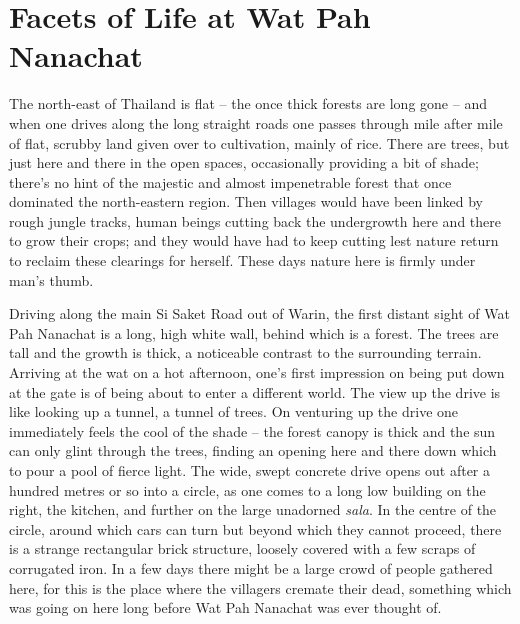 

\chapter{Facets of Life at Wat Pah Nanachat}
\markright{\chapterAuthor}

The north-east of Thailand is flat -- the once thick forests are long
gone -- and when one drives along the long straight roads one passes
through mile after mile of flat, scrubby land given over to cultivation,
mainly of rice. There are trees, but just here and there in the open
spaces, occasionally providing a bit of shade; there's no hint of the
majestic and almost impenetrable forest that once dominated the
north-eastern region. Then villages would have been linked by rough
jungle tracks, human beings cutting back the undergrowth here and there
to grow their crops; and they would have had to keep cutting lest nature
return to reclaim these clearings for herself. These days nature here is
firmly under man's thumb.

Driving along the main Si Saket Road out of Warin, the first distant
sight of Wat Pah Nanachat is a long, high white wall, behind which is a
forest. The trees are tall and the growth is thick, a noticeable
contrast to the surrounding terrain. Arriving at the wat on a hot
afternoon, one's first impression on being put down at the gate is of
being about to enter a different world. The view up the drive is like
looking up a tunnel, a tunnel of trees. On venturing up the drive one
immediately feels the cool of the shade -- the forest canopy is thick
and the sun can only glint through the trees, finding an opening here
and there down which to pour a pool of fierce light. The wide, swept
concrete drive opens out after a hundred metres or so into a circle, as
one comes to a long low building on the right, the kitchen, and further
on the large unadorned \emph{sala}. In the centre of the circle, around
which cars can turn but beyond which they cannot proceed, there is a
strange rectangular brick structure, loosely covered with a few scraps
of corrugated iron. In a few days there might be a large crowd of people
gathered here, for this is the place where the villagers cremate their
dead, something which was going on here long before Wat Pah Nanachat was
ever thought of.

